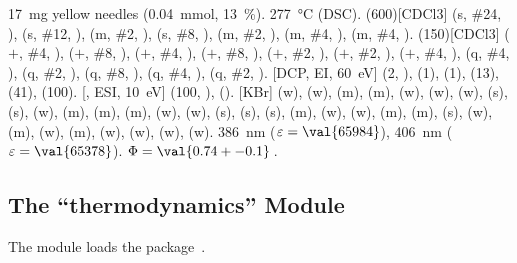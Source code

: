 \documentclass[load-preamble+]{cnltx-doc}
\def\chemmodule*#1{\textquotedblleft#1\textquotedblright}%
\begin{document}
\begin{experimental}[
    format=\color{red}\itshape,
    list=true,
    delta=\textcolor{green}{\ch{M+ + H2O}},
    pos-number=side,
    coupling-unit=\mega\gram\per\square\second,
    list-setup=,use-equal]
   \SI{17}{\milli\gram} yellow needles (\SI{0.04}{\milli\mole},
  \SI{13}{\percent}).
   \SI{277}{\celsius} (DSC).
  \NMR(600)[CDCl3]  (s, \#{24}, ),  (s, \#{12},
  ),  (m, \#{2}, ),  (s, \#{8},
  ),  (m, \#{2}, ),  (m, \#{4},
  ),  (m, \#{4}, ).
  (150)[CDCl3]  ($+$, \#{4}, ),  ($+$,
  \#{8}, ),  ($+$, \#{4}, ),  ($+$, \#{8},
  ),  ($+$, \#{2}, ),  ($+$, \#{2},
  ),  ($+$, \#{4}, ),  (q, \#{4},
  ),  (q, \#{2}, ),  (q, \#{8}, ),
   (q, \#{4}, ),  (q, \#{2}, ).
  [DCP, EI, \SI{60}{\electronvolt}]  (2, ), 
  (1),  (1),  (13),  (41),  (100).
  [, ESI, \SI{10}{\electronvolt}]  (100,
  ),  ().
  [KBr]  (w),  (w),  (m), 
  (m),  (w),  (w),  (w),  (s),
   (s),  (w),  (m),  (m), 
  (m),  (w),  (w),  (s),  (s),
   (s),  (m),  (w),  (w), 
  (m),  (m),  (s),  (w),  (m), 
  (w),  (m),  (w),  (w),  (w), 
  (w).
   \SI{386}{\nano\metre} ($\varepsilon = \val{65984}$),
  \SI{406}{\nano\metre} ($\varepsilon = \val{65378}$).
   $\Phi = \val{0.74+-0.1}$\,.
\end{experimental}

\subsection{The \chemmodule*{thermodynamics} Module}\label{sec:thermodynamics-module}

The  module loads the 
package~\cite{pkg:siunitx}.
\end{document}
